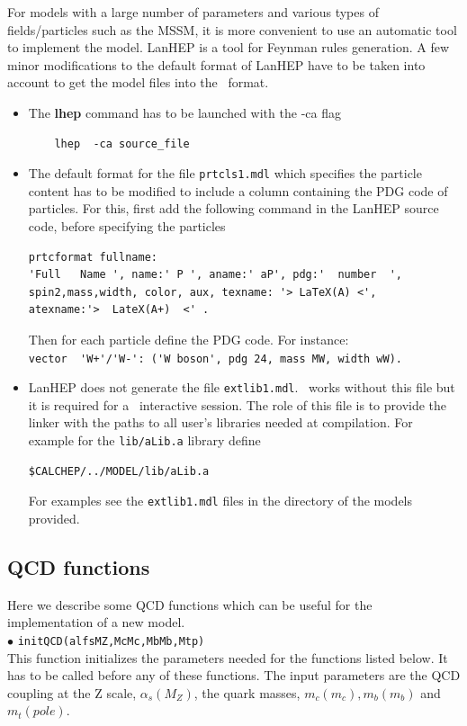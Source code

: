 \documentclass[12pt,a4paper]{article}
\begin{document}
For models with a large number of parameters and various types of fields/particles such as  the MSSM, it is more convenient to use an automatic tool to implement 
the model.  LanHEP is a  tool for Feynman  rules  generation. A few minor
modifications to the default format of LanHEP have to be taken into account to get the model files into
the \micro\ format. 
\begin{itemize}
\item  The {\bf lhep}  command has to be launched with the {-ca} flag  
\begin{verbatim}
    lhep  -ca source_file 
\end{verbatim}

\item The default format for the file \verb|prtcls1.mdl| which specifies the particle content has to be
modified to include a column containing the PDG code of particles. 
For this, first add the following command in the LanHEP source code, before specifying the particles  
\begin{verbatim}
prtcformat fullname:
'Full   Name ', name:' P ', aname:' aP', pdg:'  number  ',
spin2,mass,width, color, aux, texname: '> LaTeX(A) <',
atexname:'>  LateX(A+)  <' .
\end{verbatim}

Then for each particle  define the PDG code. For
instance:\\
\verb|vector  'W+'/'W-': ('W boson', pdg 24, mass MW, width wW).|\\




\item LanHEP does not generate the  file \verb|extlib1.mdl|.
\micro\ works without  this file but it is required for a \calchep\ interactive session. 
The role of this file is to provide the linker with the paths to all user's libraries
needed at compilation. For example for the \verb|lib/aLib.a| library define
\begin{verbatim}
$CALCHEP/../MODEL/lib/aLib.a
\end{verbatim}
For  examples see the \verb|extlib1.mdl| files in the  directory of the models provided.  

\end{itemize}

\subsection{QCD functions}
Here we describe some QCD functions which can be useful for the implementation of a new model.\\
\noindent$\bullet$ \verb|initQCD(alfsMZ,McMc,MbMb,Mtp)|\\
This function initializes the parameters needed for the functions
listed below. It has to be called before any of these functions.
The input parameters are the QCD coupling at the Z scale,
$\alpha_s(M_Z)$, the quark masses, $m_c(m_c), m_b(m_b)$ and
$m_t(pole)$.
\end{document}
